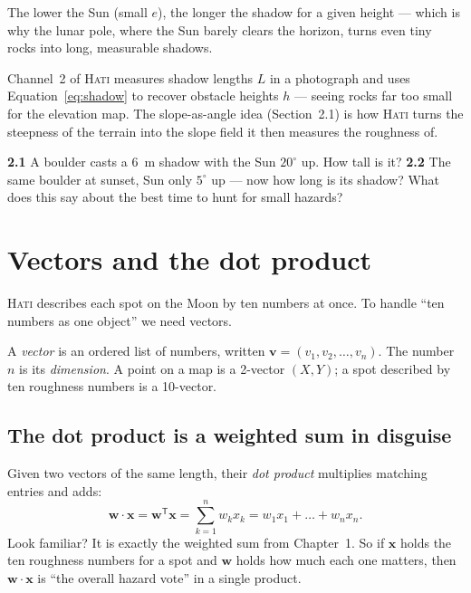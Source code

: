 \documentclass[11pt,oneside]{book}
\begin{document}
The lower the Sun (small $e$), the longer the shadow for a given height --- which is
why the lunar pole, where the Sun barely clears the horizon, turns even tiny rocks
into long, measurable shadows.

\begin{hatibox}
Channel~2 of \textsc{Hati} measures shadow lengths $L$ in a photograph and uses
Equation~\eqref{eq:shadow} to recover obstacle heights $h$ --- seeing rocks far too
small for the elevation map. The slope-as-angle idea (Section~2.1) is how
\textsc{Hati} turns the steepness of the terrain into the slope field it then measures
the roughness of.
\end{hatibox}

\begin{practice}
\textbf{2.1} A boulder casts a \SI{6}{m} shadow with the Sun $20^\circ$ up. How tall
is it? \quad\textbf{2.2} The same boulder at sunset, Sun only $5^\circ$ up --- now how
long is its shadow? What does this say about the best time to hunt for small hazards?
\end{practice}

\chapter{Vectors and the dot product}

\textsc{Hati} describes each spot on the Moon by ten numbers at once. To handle ``ten
numbers as one object'' we need vectors.

\begin{defn}
A \emph{vector} is an ordered list of numbers, written
$\mathbf v=(v_1,v_2,\dots,v_n)$. The number $n$ is its \emph{dimension}. A point on a
map is a 2-vector $(X,Y)$; a spot described by ten roughness numbers is a 10-vector.
\end{defn}

\section{The dot product is a weighted sum in disguise}
Given two vectors of the same length, their \emph{dot product} multiplies matching
entries and adds:
\begin{equation}
\mathbf w\cdot\mathbf x=\mathbf w^{\mathsf T}\mathbf x=\sum_{k=1}^{n}w_kx_k
= w_1x_1+\dots+w_nx_n .
\end{equation}
Look familiar? It is exactly the weighted sum from Chapter~1. So if $\mathbf x$ holds
the ten roughness numbers for a spot and $\mathbf w$ holds how much each one matters,
then $\mathbf w\cdot\mathbf x$ is ``the overall hazard vote'' in a single product.
\end{document}
